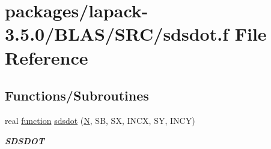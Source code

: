 \hypertarget{lapack-3_85_80_2BLAS_2SRC_2sdsdot_8f}{}\section{packages/lapack-\/3.5.0/\+B\+L\+A\+S/\+S\+R\+C/sdsdot.f File Reference}
\label{lapack-3_85_80_2BLAS_2SRC_2sdsdot_8f}
\subsection*{Functions/\+Subroutines}
\begin{DoxyCompactItemize}
\item 
real \hyperlink{afunc_8m_a7b5e596df91eadea6c537c0825e894a7}{function} \hyperlink{group__single__blas__level1_gaddc89585ced76065053abffb322c5a22}{sdsdot} (\hyperlink{polmisc_8c_a0240ac851181b84ac374872dc5434ee4}{N}, S\+B, S\+X, I\+N\+C\+X, S\+Y, I\+N\+C\+Y)
\begin{DoxyCompactList}\small\item\em {\bfseries S\+D\+S\+D\+O\+T} \end{DoxyCompactList}\end{DoxyCompactItemize}
